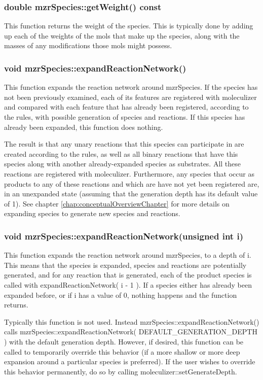 \subsubsection{double mzrSpecies::getWeight() const}
This function returns the weight of the species.  This is typically
done by adding up each of the weights of the mols that make up the
species, along with the masses of any modifications those mols might
possess.  

\subsubsection{void mzrSpecies::expandReactionNetwork()}
This function expands the reaction network around mzrSpecies.  If the
species has not been previously examined, each of its features are
registered with moleculizer and compared with each feature that has
already been registered, according to the rules, with possible
generation of species and reactions.  If this species has already been
expanded, this function does nothing.

The result is that any unary reactions that this species can
participate in are created according to the rules, as well as all
binary reactions that have this species along with another
already-expanded species as substrates.  All these reactions are
registered with moleculizer.  Furthermore, any species that occur as
products to any of these reactions and which are have not yet been
registered are, in an unexpanded state (assuming that the generation
depth has its default value of 1).  See chapter
\ref{chap:conceptualOverviewChapter} for more details on expanding
species to generate new species and reactions.

\subsubsection{void mzrSpecies::expandReactionNetwork(unsigned int i)}
This function expands the reaction network around mzrSpecies, to a
depth of i.  This means that the species is expanded, species and
reactions are potentially generated, and for any reaction that is
generated, each of the product species is called with
expandReactionNetwork( i - 1 ).  If a species either has already been
expanded before, or if i has a value of 0, nothing happens and the
function returns.  

Typically this function is not used.  Instead
mzrSpecies::expandReactionNetwork() calls
mzrSpecies::expandReactionNetwork( DEFAULT\_GENERATION\_DEPTH ) with the
default generation depth.  However, if desired, this function can be
called to temporarily override this behavior (if a more shallow or
more deep expansion around a particular species is preferred).  If the
user wishes to override this behavior permanently, do so by calling
moleculizer::setGenerateDepth.  

